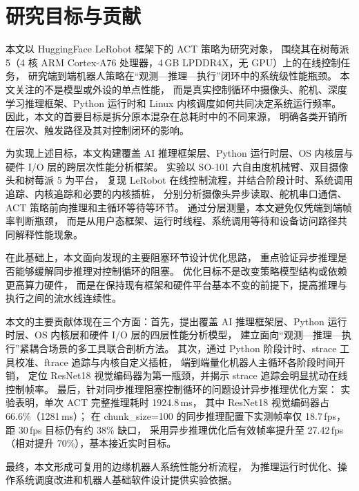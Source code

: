 \section{研究目标与贡献}

本文以 HuggingFace LeRobot 框架\cite{lerobot}下的 ACT 策略为研究对象，
围绕其在树莓派 5（4 核 ARM Cortex-A76 处理器，4\,GB LPDDR4X，无 GPU）上的在线控制任务，
研究端到端机器人策略在“观测—推理—执行”闭环中的系统级性能瓶颈。
本文关注的不是模型或外设的单点性能，
而是真实控制循环中摄像头、舵机、深度学习推理框架、Python 运行时和 Linux 内核调度如何共同决定系统运行频率。
因此，本文的首要目标是拆分原本混杂在总耗时中的不同来源，
明确各类开销所在层次、触发路径及其对控制闭环的影响。

为实现上述目标，本文构建覆盖 AI 推理框架层、Python 运行时层、OS 内核层与硬件 I/O 层的跨层次性能分析框架。
实验以 SO-101 六自由度机械臂、双目摄像头和树莓派 5 为平台，
复现 LeRobot 在线控制流程，并结合阶段计时、系统调用追踪、内核追踪和必要的内核插桩，
分别分析摄像头异步读取、舵机串口通信、ACT 策略前向推理和主循环等待等环节。
通过分层测量，本文避免仅凭端到端帧率判断瓶颈，
而是从用户态框架、运行时线程、系统调用等待和设备访问路径共同解释性能现象。

在此基础上，本文面向发现的主要阻塞环节设计优化思路，
重点验证异步推理是否能够缓解同步推理对控制循环的阻塞。
优化目标不是改变策略模型结构或依赖更高算力硬件，
而是在保持现有框架和硬件平台基本不变的前提下，提高推理与执行之间的流水线连续性。

本文的主要贡献体现在三个方面：首先，提出覆盖 AI 推理框架层、Python 运行时层、OS 内核层和硬件 I/O 层的四层性能分析模型，
建立面向“观测—推理—执行”紧耦合场景的多工具联合剖析方法。
其次，通过 Python 阶段计时、strace 工具校准、ftrace 追踪与内核自定义插桩，
端到端量化机器人主循环各阶段时间开销，
定位 ResNet18 视觉编码器为第一瓶颈，并揭示 strace 追踪会明显扰动在线控制帧率。
最后，针对同步推理阻塞控制循环的问题设计异步推理优化方案：
实验表明，单次 ACT 完整推理耗时 1924.8\,ms，
其中 ResNet18 视觉编码器占 66.6\%（1281\,ms）；
在 chunk\_size=100 的同步推理配置下实测帧率仅 18.7\,fps，距 30\,fps 目标仍有约 38\% 缺口，
采用异步推理优化后有效帧率提升至 27.42\,fps（相对提升 70\%），基本接近实时目标。

最终，本文形成可复用的边缘机器人系统性能分析流程，
为推理运行时优化、操作系统调度改进和机器人基础软件设计提供实验依据。
